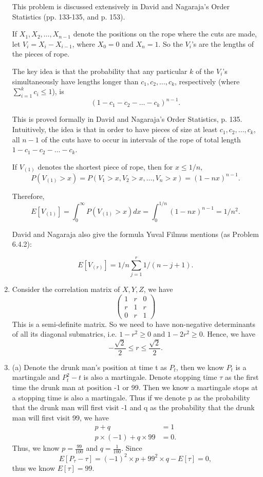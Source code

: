 \documentclass[10pt, onecolumn, draftcls]{IEEEtran}
\begin{document}
\begin{enumerate}
This problem is discussed extensively in David and Nagaraja's Order Statistics (pp. 133-135, and p. 153).

If $X_1,X_2,…,X_{n−1}$ denote the positions on the rope where the cuts are made, let $V_i=X_i-X_{i−1}$, where $X_0=0$ and $X_n=1$. So the $V_i$'s are the lengths of the pieces of rope.

The key idea is that the probability that any particular $k$ of the $V_i$'s simultaneously have lengths longer than $c_1,c_2,…,c_k$, respectively (where $\sum^k_{i=1}c_i \le 1$), is
$$(1-c_1-c_2- \ldots -c_k)^{n-1}.$$

This is proved formally in David and Nagaraja's Order Statistics, p. 135. Intuitively, the idea is that in order to have pieces of size at least $c_1,c_2,…,c_k$, all $n−1$ of the cuts have to occur in intervals of the rope of total length $1-c_1-c_2- \ldots -c_k$.

If $V_{(1)}$ denotes the shortest piece of rope, then for $x\le 1/n$,
$$P(V_{(1)}>x)=P(V_1>x,V_2>x,…,V_n>x)=(1-nx)^{n-1}.$$

Therefore,
$$E[V_{(1)}]=\int_0^{\infty} P(V_{(1)}>x)dx=\int^{1/n}_0(1-nx)^{n-1}=1/n^2.$$

David and Nagaraja also give the formula Yuval Filmus mentions (as Problem 6.4.2):

$$E[V_{(r)}]=1/n \sum_{j=1}^r 1/(n-j+1).$$

\item Consider the correlation matrix of $X, Y, Z$, we have
\[ \left(
\begin{array}{ccc}
1 &r &0\\
r &1 &r\\
0 &r &1
\end{array}
\right) \]
This is a semi-definite matrix. So we need to have non-negative determinants of all its diagonal submatrics, i.e. $1 -r^2 \geq 0$ and $1-2r^2\geq 0$. Hence, we have 
$$-\frac{\sqrt{2}}{2}\leq r\leq \frac{\sqrt{2}}{2}.$$

\item
(a) Denote the drunk man's position at time t as $P_{t}$, then we know $P_{t}$ is a martingale and $P_{t}^{2}-t$ is also a martingale. Denote stopping time $\tau$ as the first time the drunk man at position -1 or 99. Then we know a martingale stops at a stopping time is also a martingale. Thus if we denote p as the probability that the drunk man will first visit -1 and q as the probability that the drunk man will first visit 99, we have
\begin{align}
p+q&=1\nonumber\\
p\times (-1) + q\times 99 &= 0.\nonumber 
\end{align}
Thus, we know $p=\frac{99}{100}$ and $q=\frac{1}{100}$. Since
\begin{equation}
E[P_{\tau}-\tau] = (-1)^{2}\times p + 99^{2}\times q - E[\tau]=0,\nonumber 
\end{equation}
thus we know $E[\tau]=99$.


\end{enumerate}
\end{document}
